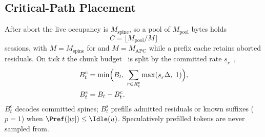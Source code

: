\subsection{Critical-Path Placement}
\label{sec:schedule}
After abort the live occupancy is $M_{\mathrm{spine}}$, so a pool of $M_{\mathrm{pool}}$ bytes holds
\begin{equation}
\label{eq:slots}
C=\bigl\lfloor M_{\mathrm{pool}}/M\bigr\rfloor
\end{equation}
sessions, with $M{=}M_{\mathrm{spine}}$ for \sys and $M{=}M_{\mathrm{APC}}$ while a prefix cache retains aborted residuals.
On tick $t$ the chunk budget~\cite{sarathi} is split by the committed rate $\underline{s}_r$~\cite{jitserve},
\begin{align}
B^{\mathrm{c}}_t &= \min\Bigl(B_t,\; \sum_{r\in R^{\mathrm{c}}_t}\max(\underline{s}_r\Delta,\;1)\Bigr), \label{eq:bc}\\
B^{\mathrm{s}}_t &= B_t-B^{\mathrm{c}}_t. \label{eq:bs}
\end{align}
$B^{\mathrm{c}}_t$ decodes committed spines; $B^{\mathrm{s}}_t$ prefills admitted residuals or known suffixes ($p{=}1$) when $\Pref(|w|)\le\Idle(u)$.
Speculatively prefilled tokens are never sampled from.
